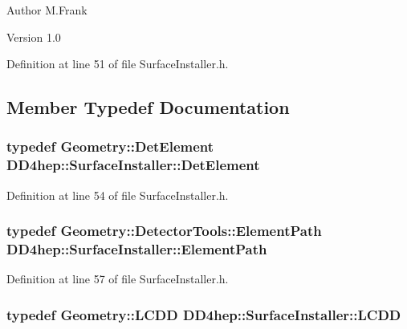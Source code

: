 \begin{DoxyAuthor}{Author}
M.Frank 
\end{DoxyAuthor}
\begin{DoxyVersion}{Version}
1.0 
\end{DoxyVersion}


Definition at line 51 of file SurfaceInstaller.h.

\subsection{Member Typedef Documentation}
\hypertarget{class_d_d4hep_1_1_surface_installer_ab88f41bd9efd54b4b67baee892bfa926}{
\subsubsection[{DetElement}]{\setlength{\rightskip}{0pt plus 5cm}typedef {\bf Geometry::DetElement} {\bf DD4hep::SurfaceInstaller::DetElement}}}
\label{class_d_d4hep_1_1_surface_installer_ab88f41bd9efd54b4b67baee892bfa926}


Definition at line 54 of file SurfaceInstaller.h.\hypertarget{class_d_d4hep_1_1_surface_installer_a731a72c192bdf217f206f0a04ff9dea7}{
\subsubsection[{ElementPath}]{\setlength{\rightskip}{0pt plus 5cm}typedef {\bf Geometry::DetectorTools::ElementPath} {\bf DD4hep::SurfaceInstaller::ElementPath}}}
\label{class_d_d4hep_1_1_surface_installer_a731a72c192bdf217f206f0a04ff9dea7}


Definition at line 57 of file SurfaceInstaller.h.\hypertarget{class_d_d4hep_1_1_surface_installer_a155d137884c31b56d13fb58846e562a3}{
\subsubsection[{LCDD}]{\setlength{\rightskip}{0pt plus 5cm}typedef {\bf Geometry::LCDD} {\bf DD4hep::SurfaceInstaller::LCDD}}}
\label{class_d_d4hep_1_1_surface_installer_a155d137884c31b56d13fb58846e562a3}


